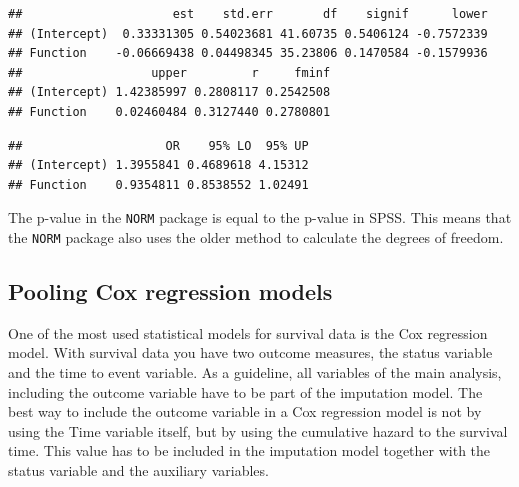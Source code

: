 \documentclass[]{book}
\newenvironment{Shaded}{\begin{snugshade}}{\end{snugshade}}
\newcommand{\KeywordTok}[1]{\textcolor[rgb]{0.13,0.29,0.53}{\textbf{#1}}}
\newcommand{\DecValTok}[1]{\textcolor[rgb]{0.00,0.00,0.81}{#1}}
\newcommand{\StringTok}[1]{\textcolor[rgb]{0.31,0.60,0.02}{#1}}
\newcommand{\OperatorTok}[1]{\textcolor[rgb]{0.81,0.36,0.00}{\textbf{#1}}}
\newcommand{\NormalTok}[1]{#1}
\begin{document}
\begin{verbatim}
##                     est    std.err       df    signif      lower
## (Intercept)  0.33331305 0.54023681 41.60735 0.5406124 -0.7572339
## Function    -0.06669438 0.04498345 35.23806 0.1470584 -0.1579936
##                  upper         r     fminf
## (Intercept) 1.42385997 0.2808117 0.2542508
## Function    0.02460484 0.3127440 0.2780801
\end{verbatim}

\begin{Shaded}
\end{Shaded}

\begin{verbatim}
##                    OR    95% LO  95% UP
## (Intercept) 1.3955841 0.4689618 4.15312
## Function    0.9354811 0.8538552 1.02491
\end{verbatim}

The p-value in the \texttt{NORM} package is equal to the p-value in
SPSS. This means that the \texttt{NORM} package also uses the older
method to calculate the degrees of freedom.

\subsection{Pooling Cox regression
models}\label{pooling-cox-regression-models}

One of the most used statistical models for survival data is the Cox
regression model. With survival data you have two outcome measures, the
status variable and the time to event variable. As a guideline, all
variables of the main analysis, including the outcome variable have to
be part of the imputation model. The best way to include the outcome
variable in a Cox regression model is not by using the Time variable
itself, but by using the cumulative hazard to the survival time. This
value has to be included in the imputation model together with the
status variable and the auxiliary variables.
\end{document}
